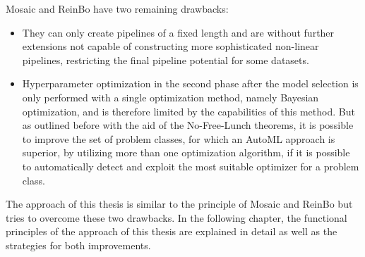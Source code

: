 Mosaic and ReinBo have two remaining drawbacks:
\begin{itemize}
    \item They can only create pipelines of a fixed length and are without further extensions not capable of constructing more sophisticated non-linear pipelines, restricting the final pipeline potential for some datasets.
    \item Hyperparameter optimization in the second phase after the model selection is only performed with a single optimization method, namely Bayesian optimization, and is therefore limited by the capabilities of this method.
    But as outlined before with the aid of the No-Free-Lunch theorems, it is possible to improve the set of problem classes, for which an AutoML approach is superior, by utilizing more than one optimization algorithm, if it is possible to automatically detect and exploit the most suitable optimizer for a problem class.
\end{itemize}
The approach of this thesis is similar to the principle of Mosaic and ReinBo but tries to overcome these two drawbacks.
In the following chapter, the functional principles of the approach of this thesis are explained in detail as well as the strategies for both improvements.
